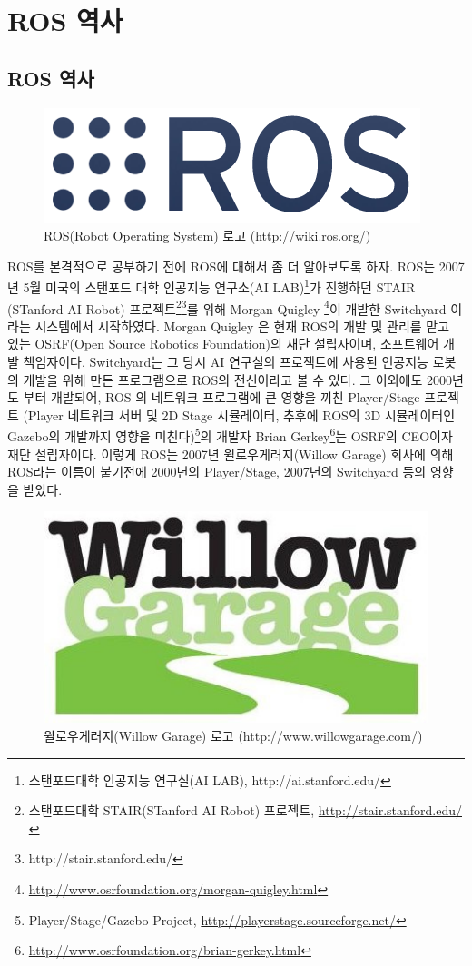 \section{ROS 역사}

\subsection{ROS 역사}

\begin{figure}[h]
\centering\includegraphics[width=0.5\columnwidth]{pictures/chapter1/roslogo.png}
\caption{ROS(Robot Operating System) 로고 (http://wiki.ros.org/)}
\end{figure}

ROS를 본격적으로 공부하기 전에 ROS에 대해서 좀 더 알아보도록 하자. ROS는 2007년 5월 미국의 스탠포드 대학 인공지능 연구소(AI LAB)\footnote{스탠포드대학 인공지능 연구실(AI LAB), http://ai.stanford.edu/}가 진행하던 STAIR (STanford AI Robot) 프로젝트\footnote{스탠포드대학 STAIR(STanford AI Robot) 프로젝트, \url{http://stair.stanford.edu/}}\footnote{http://stair.stanford.edu/}를 위해 Morgan Quigley \footnote{\url{http://www.osrfoundation.org/morgan-quigley.html}}이 개발한 Switchyard 이라는 시스템에서 시작하였다. Morgan Quigley 은 현재 ROS의 개발 및 관리를 맡고 있는 OSRF(Open Source Robotics Foundation)의 재단 설립자이며, 소프트웨어 개발 책임자이다. Switchyard는 그 당시 AI 연구실의 프로젝트에 사용된 인공지능 로봇의 개발을 위해 만든 프로그램으로 ROS의 전신이라고 볼 수 있다. 그 이외에도 2000년도 부터 개발되어, ROS 의 네트워크 프로그램에 큰 영향을 끼친 Player/Stage 프로젝트 (Player 네트워크 서버 및 2D Stage 시뮬레이터, 추후에 ROS의 3D 시뮬레이터인 Gazebo의 개발까지 영향을 미친다)\footnote{Player/Stage/Gazebo Project, \url{http://playerstage.sourceforge.net/}}의 개발자 Brian Gerkey\footnote{\url{http://www.osrfoundation.org/brian-gerkey.html}}는 OSRF의 CEO이자 재단 설립자이다. 이렇게 ROS는 2007년 윌로우게러지(Willow Garage) 회사에 의해 ROS라는 이름이 붙기전에 2000년의 Player/Stage, 2007년의 Switchyard 등의 영향을 받았다.

\begin{figure}[h]
\centering\includegraphics[width=0.5\columnwidth]{pictures/chapter1/willow_garage_logo.jpg}
\caption{윌로우게러지(Willow Garage) 로고 (http://www.willowgarage.com/)}
\end{figure}

